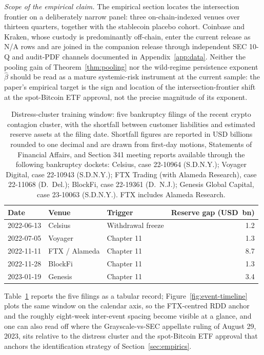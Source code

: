 \documentclass[12pt]{article}
\theoremstyle{sampledef}
\theoremstyle{sampleplain}
\theoremstyle{sampleremark}
\newcommand{\1}{\mathbf{1}}
\begin{document}
\textit{Scope of the empirical claim.} The empirical section
locates the intersection frontier on a deliberately narrow panel:
three on-chain-indexed venues over thirteen quarters, together
with the stablecoin placebo cohort. Coinbase and Kraken, whose
custody is predominantly off-chain, enter the current release as
N/A rows and are joined in the companion release through
independent SEC 10-Q and audit-PDF channels documented in
Appendix~\ref{app:data}. Neither the pooling gain of
Theorem~\ref{thm:pooling} nor the wild-regime persistence exponent
$\hat\beta$ should be read as a mature systemic-risk instrument at
the current sample: the paper's empirical target is the sign and
location of the intersection-frontier shift at the spot-Bitcoin
ETF approval, not the precise magnitude of its exponent.

\begin{table}[H]
\centering
\caption{Distress-cluster training window: five bankruptcy filings
of the recent crypto contagion cluster, with the shortfall between
customer liabilities and estimated reserve assets at the filing
date. Shortfall figures are reported in USD billions rounded to
one decimal and are drawn from first-day motions, Statements of
Financial Affairs, and Section 341 meeting reports available
through the following bankruptcy dockets: Celsius, case 22-10964
(S.D.N.Y.); Voyager Digital, case 22-10943 (S.D.N.Y.); FTX
Trading (with Alameda Research), case 22-11068 (D.\ Del.); BlockFi,
case 22-19361 (D.\ N.J.); Genesis Global Capital, case 23-10063
(S.D.N.Y.). FTX includes Alameda Research.}
\label{tab:distress-events}
\begin{tabular}{lllr}
\toprule
Date & Venue & Trigger & Reserve gap (USD~bn) \\
\midrule
2022-06-13 & Celsius       & Withdrawal freeze  & 1.2 \\
2022-07-05 & Voyager       & Chapter 11         & 1.3 \\
2022-11-11 & FTX / Alameda & Chapter 11         & 8.7 \\
2022-11-28 & BlockFi       & Chapter 11         & 1.3 \\
2023-01-19 & Genesis       & Chapter 11         & 3.4 \\
\bottomrule
\end{tabular}
\end{table}

Table~\ref{tab:distress-events} reports the five filings as a
tabular record; Figure~\ref{fig:event-timeline} plots the same
window on the calendar axis, so the FTX-centred RDD anchor and the
roughly eight-week inter-event spacing become visible at a glance,
and one can also read off where the Grayscale-vs-SEC appellate
ruling of August 29, 2023, sits relative to the distress cluster
and the spot-Bitcoin ETF approval that anchors the identification
strategy of Section~\ref{sec:empirics}.
\end{document}
